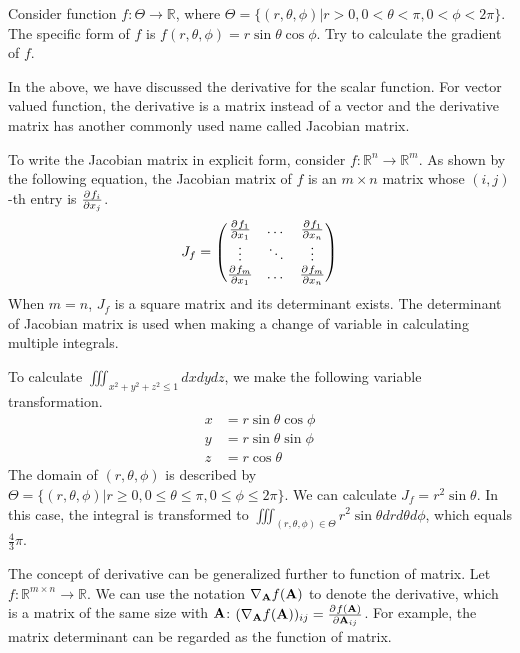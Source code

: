 \begin{exercise}
Consider function $f: \Theta \to \mathbb{R}$, where $\Theta = \{(r, \theta, \phi)| r>0, 0<\theta<\pi, 0<\phi < 2\pi\}$. The specific form of $f$ is $f(r, \theta,\phi) = r \sin \theta \cos\phi$. Try to calculate the gradient of $f$.
\end{exercise}

In the above, we have discussed the derivative for the scalar function. For vector valued function, the derivative is a matrix instead of a vector and the derivative matrix has another commonly used name called Jacobian matrix.

To write the Jacobian matrix in explicit form, consider $f: \mathbb{R}^n \to \mathbb{R}^m$. As shown by the following equation, the Jacobian matrix of $f$ is an $m\times n$ matrix whose $(i,j)$-th entry is $\frac{\partial^{} f_i}{\partial x_j}$.
\begin{equation}
J_f = \begin{pmatrix}
\frac{\partial^{} f_1}{\partial x_1} & \dots & \frac{\partial^{} f_1}{\partial x_n} \\
\vdots & \ddots & \vdots \\
\frac{\partial^{} f_m}{\partial x_1} & \dots & \frac{\partial^{} f_m}{\partial x_n}
\end{pmatrix}
\end{equation}
When $m=n$, $J_f$ is a square matrix and its determinant exists.
The determinant of Jacobian matrix is used when making a change of variable in calculating multiple integrals.
\begin{example}
To calculate	$\iiint_{x^2 + y^2 +z^2 \leq 1} dxdydz$, we make the following variable transformation.
\begin{align*}
x & = r \sin \theta \cos \phi \\
y & = r \sin \theta \sin \phi \\
z & = r \cos \theta
\end{align*}
The domain of $(r, \theta, \phi)$ is described by $\Theta =  \{(r, \theta, \phi)| r \geq 0, 0\leq \theta \leq \pi, 0\leq \phi \leq 2\pi\}$. We can calculate $J_f = r^2 \sin \theta $. In this case, the integral is transformed to $\iiint_{(r, \theta, \phi) \in \Theta} r^2 \sin \theta drd\theta d\phi$, which equals $\frac{4}{3} \pi $.
\end{example}
The concept of derivative can be generalized further to function of matrix. Let $f: \mathbb{R}^{m \times n} \to \mathbb{R}$. We can use the notation $\nabla_{
	\mathbf{A}} f(\mathbf{A}) $ to denote the derivative, which is a matrix of the same size with $\mathbf{A}$:
$(\nabla_{\mathbf{A}} f(\mathbf{A}))_{ij} = \frac{\partial^{} f(\mathbf{A})}{\partial \mathbf{A}_{ij}}$. For example, the matrix determinant can be regarded as the function of matrix.

